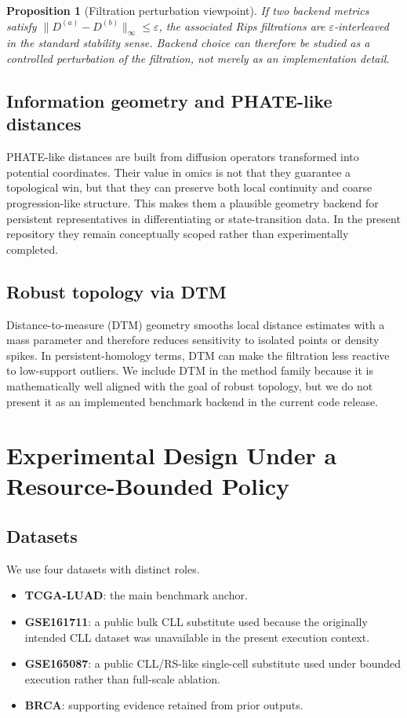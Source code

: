 \documentclass[11pt]{article}
\newtheorem{proposition}{Proposition}
\begin{document}
\begin{proposition}[Filtration perturbation viewpoint]
If two backend metrics satisfy $\|D^{(a)}-D^{(b)}\|_{\infty} \le \varepsilon$, the associated Rips filtrations are $\varepsilon$-interleaved in the standard stability sense. Backend choice can therefore be studied as a controlled perturbation of the filtration, not merely as an implementation detail.
\end{proposition}

\subsection{Information geometry and PHATE-like distances}
PHATE-like distances are built from diffusion operators transformed into potential coordinates. Their value in omics is not that they guarantee a topological win, but that they can preserve both local continuity and coarse progression-like structure. This makes them a plausible geometry backend for persistent representatives in differentiating or state-transition data. In the present repository they remain conceptually scoped rather than experimentally completed.

\subsection{Robust topology via DTM}
Distance-to-measure (DTM) geometry smooths local distance estimates with a mass parameter and therefore reduces sensitivity to isolated points or density spikes. In persistent-homology terms, DTM can make the filtration less reactive to low-support outliers. We include DTM in the method family because it is mathematically well aligned with the goal of robust topology, but we do not present it as an implemented benchmark backend in the current code release.

\section{Experimental Design Under a Resource-Bounded Policy}
\subsection{Datasets}
We use four datasets with distinct roles.
\begin{itemize}[leftmargin=1.5em]
\item \textbf{TCGA-LUAD}: the main benchmark anchor.
\item \textbf{GSE161711}: a public bulk CLL substitute used because the originally intended CLL dataset was unavailable in the present execution context.
\item \textbf{GSE165087}: a public CLL/RS-like single-cell substitute used under bounded execution rather than full-scale ablation.
\item \textbf{BRCA}: supporting evidence retained from prior outputs.
\end{itemize}
\end{document}
